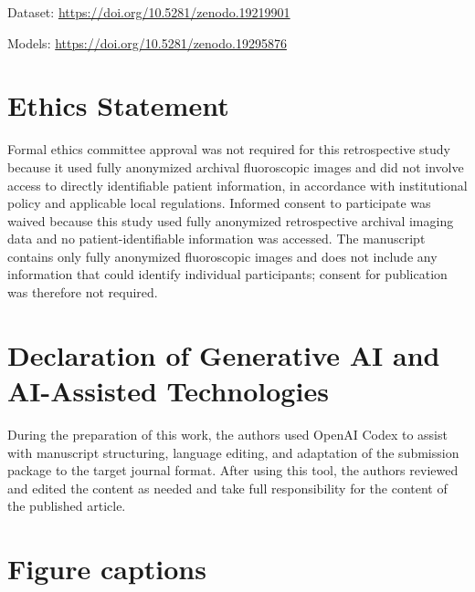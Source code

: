 \documentclass[utf8]{FrontiersinHarvard}
\begin{document}
Dataset: \url{https://doi.org/10.5281/zenodo.19219901}

Models: \url{https://doi.org/10.5281/zenodo.19295876}

\section*{Ethics Statement}

Formal ethics committee approval was not required for this retrospective study because it used fully anonymized archival fluoroscopic 
images and did not involve access to directly identifiable patient information, in accordance with institutional policy and applicable 
local regulations. Informed consent to participate was waived because this study used fully anonymized retrospective archival imaging 
data and no patient-identifiable information was accessed. The manuscript contains only fully anonymized fluoroscopic images and does 
not include any information that could identify individual participants; consent for publication was therefore not required.

\section*{Declaration of Generative AI and AI-Assisted Technologies}

During the preparation of this work, the authors used OpenAI Codex to assist with manuscript structuring, language editing, and 
adaptation of the submission package to the target journal format. After using this tool, the authors reviewed and edited the 
content as needed and take full responsibility for the content of the published article.

\nolinenumbers






\section*{Figure captions}
\end{document}
